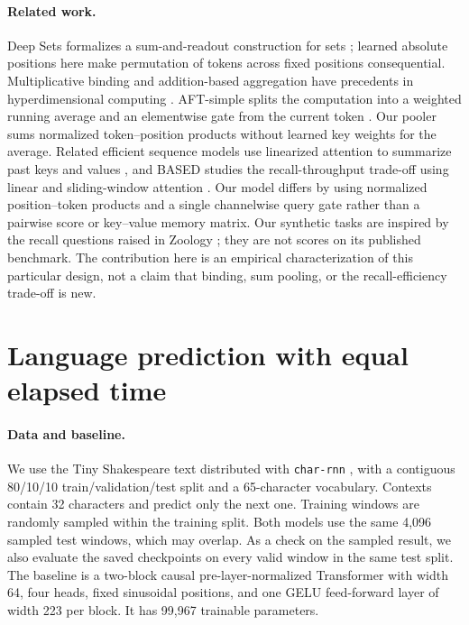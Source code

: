 \documentclass[11pt]{article}
\begin{document}
\paragraph{Related work.}
Deep Sets formalizes a sum-and-readout construction for sets \cite{zaheer}; learned absolute positions here make permutation of tokens across fixed positions consequential. Multiplicative binding and addition-based aggregation have precedents in hyperdimensional computing \cite{kanerva}. AFT-simple splits the computation into a weighted running average and an elementwise gate from the current token \cite{aft}. Our pooler sums normalized token--position products without learned key weights for the average. Related efficient sequence models use linearized attention to summarize past keys and values \cite{katharopoulos}, and BASED studies the recall-throughput trade-off using linear and sliding-window attention \cite{based}. Our model differs by using normalized position--token products and a single channelwise query gate rather than a pairwise score or key--value memory matrix. Our synthetic tasks are inspired by the recall questions raised in Zoology \cite{zoology}; they are not scores on its published benchmark. The contribution here is an empirical characterization of this particular design, not a claim that binding, sum pooling, or the recall-efficiency trade-off is new.

\section{Language prediction with equal elapsed time}
\paragraph{Data and baseline.}
We use the Tiny Shakespeare text distributed with \texttt{char-rnn} \cite{shakespeare}, with a contiguous 80/10/10 train/validation/test split and a 65-character vocabulary. Contexts contain 32 characters and predict only the next one. Training windows are randomly sampled within the training split. Both models use the same 4,096 sampled test windows, which may overlap. As a check on the sampled result, we also evaluate the saved checkpoints on every valid window in the same test split. The baseline is a two-block causal pre-layer-normalized Transformer \cite{vaswani} with width 64, four heads, fixed sinusoidal positions, and one GELU feed-forward layer of width 223 per block. It has 99,967 trainable parameters.
\end{document}

